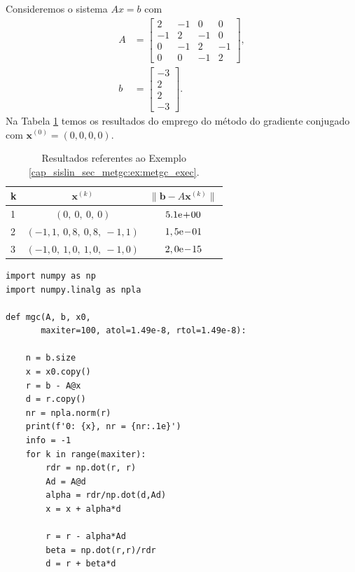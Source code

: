 \begin{ex}\label{cap_sislin_sec_metgc:ex:metgc_exec}
  Consideremos o sistema $Ax = b$ com
  \begin{align}
    A &=
    \begin{bmatrix}
      2 & -1 & 0 & 0\\
      -1 & 2 & -1 & 0\\
      0 & -1 & 2 & -1 \\
      0 & 0 & -1 & 2
    \end{bmatrix},\\
    b &=
    \begin{bmatrix}
      -3\\
      2\\
      2\\
      -3
    \end{bmatrix}.
  \end{align}
  Na Tabela \ref{cap_sislin_sec_metgc:tab:metgc_exec} temos os resultados do emprego do método do gradiente conjugado com $\pmb{x}^{(0)} = (0, 0, 0, 0)$.

  \begin{table}[H]
    \centering
    \caption{Resultados referentes ao Exemplo \ref{cap_sislin_sec_metgc:ex:metgc_exec}.}
    \label{cap_sislin_sec_metgc:tab:metgc_exec}
    \begin{tabular}{l|c|c}
      k & $\pmb{x}^{(k)}$ & $\|\pmb{b}-A\pmb{x}^{(k)}\|$\\\hline
      1 & $(0,~0,~0,~0)$ & $5.1\mathrm{e}\!+\!00$\\
      2 & $(-1,1,~0,8,~0,8,~-1,1)$ & $1,5\mathrm{e}\!-\!01$\\
      3 & $(-1,0,~1,0,~1,0,~-1,0)$ & $2,0\mathrm{e}\!-\!15$\\\hline
    \end{tabular}
  \end{table}

\begin{lstlisting}[caption=mgc.py, label=cap_sislin_sec_metgc:cod:mgc.py]
import numpy as np
import numpy.linalg as npla

def mgc(A, b, x0,
       maxiter=100, atol=1.49e-8, rtol=1.49e-8):
    
    n = b.size
    x = x0.copy()
    r = b - A@x
    d = r.copy()
    nr = npla.norm(r)
    print(f'0: {x}, nr = {nr:.1e}')
    info = -1
    for k in range(maxiter):
        rdr = np.dot(r, r)
        Ad = A@d
        alpha = rdr/np.dot(d,Ad)
        x = x + alpha*d

        r = r - alpha*Ad
        beta = np.dot(r,r)/rdr
        d = r + beta*d


\end{lstlisting}
\end{ex}
